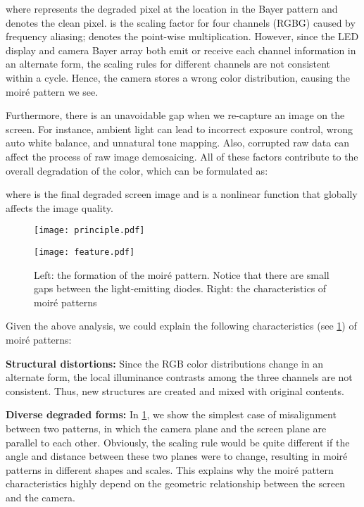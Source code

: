 \documentclass[runningheads]{llncs}
\begin{document}
where  represents the degraded pixel at the location  in the Bayer pattern and
 denotes the clean pixel.  is the scaling factor for four channels (RGBG) caused by frequency aliasing;  denotes the point-wise multiplication. However, since the LED display and camera Bayer array both emit or receive each channel information in an alternate form, the scaling rules for different channels are not consistent within a cycle. Hence, the camera stores a wrong color distribution, causing the moiré pattern we see. 

Furthermore, there is an unavoidable gap when we re-capture an image on the screen. For instance, ambient light can lead to incorrect exposure control, wrong auto white balance, and unnatural tone mapping. Also, corrupted raw data can affect the process of raw image demosaicing. All of these factors contribute to the overall degradation of the color, which can be formulated as:

where  is the final degraded screen image and  is a nonlinear function that globally affects the image quality.

\begin{figure}[t]
\begin{minipage}[t]{0.5\textwidth}
\centering
\texttt{[image: principle.pdf]}
\end{minipage}
\begin{minipage}[t]{0.5\textwidth}
\centering
\texttt{[image: feature.pdf]}
\end{minipage}
\caption{Left: the formation of the moiré pattern.  Notice that there are small gaps between the light-emitting diodes. Right: the characteristics of moiré patterns}
\label{fig:principle}

   
\end{figure}

Given the above analysis, we could explain the following characteristics (see \cref{fig:principle}) of moiré patterns:


\noindent\textbf{Structural distortions:}
Since the RGB color distributions change in an alternate form, the local illuminance contrasts among the three channels are not consistent. Thus, new structures are created and mixed with original contents.


\noindent\textbf{Diverse degraded forms:}
In \cref{fig:principle}, we show the simplest case of misalignment between two patterns, in which the camera plane and the screen plane are parallel to each other. Obviously, the scaling rule would be quite different if the angle and distance between these two planes were to change, resulting in moiré patterns in different shapes and scales. This explains why the moiré pattern characteristics highly depend on the geometric relationship between the screen and the camera. 
\end{document}
